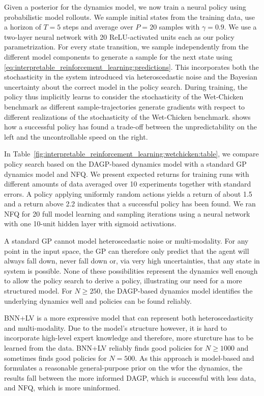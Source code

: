 Given a posterior for the dynamics model, we now train a neural policy using probabilistic model rollouts.
We sample initial states from the training data, use a horizon of $T = 5$ steps and average over $P = 20$ samples with $\gamma = 0.9$.
We use a two-layer neural network with 20 ReLU-activated units each as our policy parametrization.
For every state transition, we sample independently from the different model components to generate a sample for the next state using \cref{eq:interpretable_reinforcement_learning:predictions}.
This incorporates both the stochasticity in the system introduced via heteroscedastic noise and the Bayesian uncertainty about the correct model in the policy search.
During training, the policy thus implicitly learns to consider the stochasticity of the Wet-Chicken benchmark as different sample-trajectories generate gradients with respect to different realizations of the stochasticity of the Wet-Chicken benchmark.
 shows how a successful policy has found a trade-off between the unpredictability on the left and the uncontrollable speed on the right.

In Table~\ref{fig:interpretable_reinforcement_learning:wetchicken:table}, we compare policy search based on the DAGP-based dynamics model with a standard GP dynamics model and NFQ.
We present expected returns for training runs with different amounts of data averaged over 10 experiments together with standard errors.
A policy applying uniformly random actions yields a return of about \num{1.5} and a return above \num{2.2} indicates that a successful policy has been found.
We ran NFQ for 20 full model learning and sampling iterations using a neural network with one 10-unit hidden layer with sigmoid activations.

A standard GP cannot model heteroscedastic noise or multi-modality.
For any point in the input space, the GP can therefore only predict that the agent will always fall down, never fall down or, via very high uncertainties, that any state in system is possible.
None of these possibilities represent the dynamics well enough to allow the policy search to derive a policy, illustrating our need for a more structured model.
For $N \geq 250$, the DAGP-based dynamics model identifies the underlying dynamics well and policies can be found reliably.

BNN+LV is a more expressive model that can represent both heteroscedasticity and multi-modality.
Due to the model's structure however, it is hard to incorporate high-level expert knowledge and therefore, more sturcture has to be learned from the data.
BNN+LV reliably finds good policies for $N \geq 1000$ and sometimes finds good policies for $N = 500$.
As this approach is model-based and formulates a reasonable general-purpose prior on the wfor the dynamics, the results fall between the more informed DAGP, which is successful with less data, and NFQ, which is more uninformed.


